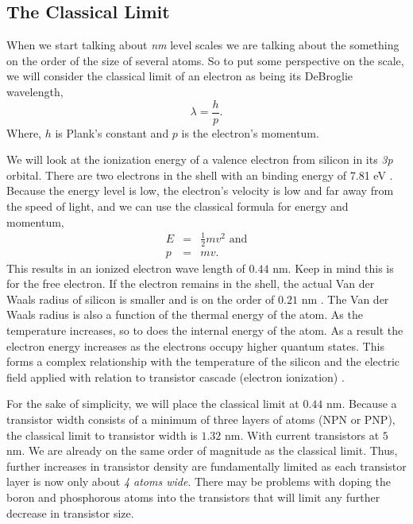 \documentclass[runningheads]{llncs}
\begin{document}
\subsection{The Classical Limit}
When we start talking about \emph{nm} level scales we are talking about the something on the order of the size of several atoms.
So to put some perspective on the scale, we will consider the classical limit of an electron as being its DeBroglie wavelength,
\begin{equation}
    \lambda = \frac{h}{p}.
\end{equation}
Where, $h$ is Plank's constant and $p$ is the electron's momentum.

We will look at the ionization energy of a valence electron from silicon in its \emph{3p} orbital.
There are two electrons in the shell with an binding energy of 7.81 eV \cite{shattuck2017ionization}.
Because the energy level is low, the electron's velocity is low and far away from the speed of light, and we can use the classical formula for energy and momentum,
\begin{eqnarray}
    E &=& \frac{1}{2} m v^2 \mbox{ and} \\
    p &=& mv.
\end{eqnarray}
This results in an ionized electron wave length of $0.44$ nm.
Keep in mind this is for the free electron.
If the electron remains in the shell, the actual Van der Waals radius of silicon is smaller and is on the order of $0.21$ nm \cite{VdW-Si}.
The Van der Waals radius is also a function of the thermal energy of the atom.
As the temperature increases, so to does the internal energy of the atom.
As a result the electron energy increases as the electrons occupy higher quantum states.
This forms a complex relationship with the temperature of the silicon and the electric field applied with relation to transistor cascade (electron ionization) \cite{maes1990impact}.

For the sake of simplicity, we will place the classical limit at $0.44$ nm.
Because a transistor width consists of a minimum of three layers of atoms (NPN or PNP), the classical limit to transistor width is $1.32$ nm.
With current transistors at $5$ nm. We are already on the same order of magnitude as the classical limit.
Thus, further increases in transistor density are fundamentally limited as each transistor layer is now only about \emph{4 atoms wide}.
There may be problems with doping the boron and phosphorous atoms into the transistors that will limit any further decrease in transistor size.
\end{document}
